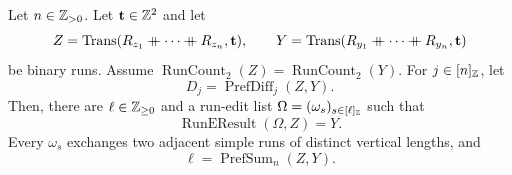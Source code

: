 \begin{lemma}\label{lem:binary-prefix-exchanges}
Let $n\in\mathbb Z_{>0}$.
Let $\mathbf t\in\mathbb Z^2$ and let
\[
 Z=\operatorname{Trans}(R_{z_1}\ccn \cdots\ccn R_{z_n},\mathbf t),\qquad
 Y=\operatorname{Trans}(R_{y_1}\ccn \cdots\ccn R_{y_n},\mathbf t)
\]
be binary runs.
Assume $\operatorname{RunCount}_2(Z)=\operatorname{RunCount}_2(Y)$.
For $j\in[n]_{\mathbb Z}$, let
\[
 D_j=\operatorname{PrefDiff}_j(Z,Y).
\]
Then, there are $\ell\in\mathbb Z_{\ge0}$ and a run-edit list $\Omega=(\omega_s)_{s\in[\ell]_{\mathbb Z}}$ such that
\[
 \operatorname{RunEResult}(\Omega,Z)=Y.
\]
Every $\omega_s$ exchanges two adjacent simple runs of distinct vertical lengths, and
\begin{equation}\label{eq:binary-exchange-distance}
 \ell=\operatorname{PrefSum}_n(Z,Y).
\end{equation}
\end{lemma}
